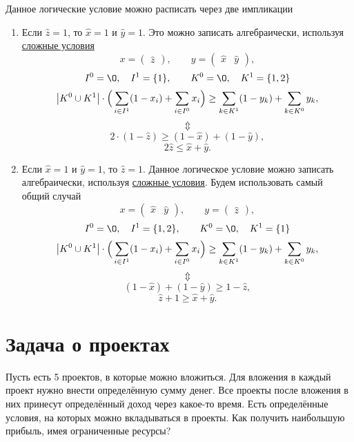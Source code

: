 Данное логические условие можно расписать через две импликации
\begin{enumerate}[nosep]
	\item Если $\hat{z} = 1$, то $\hat{x} = 1$ и $\hat{y} = 1$. Это можно записать алгебраически, используя \hyperref[fact:complex_conditions]{сложные условия}
	\[
	x = \begin{pmatrix}\hat{z}\end{pmatrix}, \qquad y = \begin{pmatrix} \hat{x} & \hat{y} \end{pmatrix},
	\]
	\[
	I^0 = \O, \quad I^1 = \{1\}, \qquad K^0 = \O, \quad K^1 = \{1, 2\}
	\]
	\[
	\abs{K^0 \cup K^1} \cdot \Big(\sum_{i \in I^1}(1-x_i) + \sum_{i \in I^0}x_i\Big) \ge \sum_{k \in K^1}(1-y_k) + \sum_{k \in K^0}y_k,
	\]	
	\[\Updownarrow\]	
	\[
	2 \cdot (1 - \hat{z}) \ge (1 - \hat{x}) + (1 - \hat{y}),
	\]
	\[
	2\hat{z} \le \hat{x} + \hat{y}.
	\]
	
	\item Если $\hat{x} = 1$ и $\hat{y} = 1$, то $\hat{z} = 1$. Данное логическое условие можно записать алгебраически, используя \hyperref[fact:complex_conditions]{сложные условия}. Будем использовать самый общий случай
	\[
	x = \begin{pmatrix}\hat{x} & \hat{y}\end{pmatrix}, \qquad y = \begin{pmatrix} \hat{z} \end{pmatrix},
	\]
	\[
	I^0 = \O, \quad I^1 = \{1, 2\}, \qquad K^0 = \O, \quad K^1 = \{1\}
	\]
	\[
	\abs{K^0 \cup K^1} \cdot \Big(\sum_{i \in I^1}(1-x_i) + \sum_{i \in I^0}x_i\Big) \ge \sum_{k \in K^1}(1-y_k) + \sum_{k \in K^0}y_k,
	\]
	\[\Updownarrow\]
	\[
	(1 - \hat{x}) + (1 - \hat{y}) \ge 1 - \hat{z},
	\]
	\[
	\hat{z} + 1 \ge \hat{x} + \hat{y}.
	\]
\end{enumerate}

\section{Задача о проектах}

\problem[о проектах]

Пусть есть 5 проектов, в которые можно вложиться. Для вложения в каждый проект нужно внести определённую сумму денег. Все проекты после вложения в них принесут определённый доход через какое-то время. Есть определённые условия, на которых можно вкладываться в проекты. Как получить наибольшую прибыль, имея ограниченные ресурсы?

